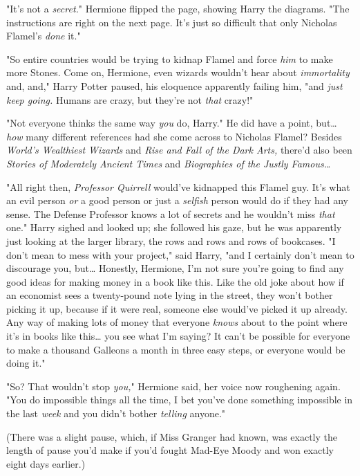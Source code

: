"It's not a \emph{secret.}" Hermione flipped the page, showing Harry the 
diagrams. "The instructions are right on the next page. It's just so difficult 
that only Nicholas Flamel's \emph{done} it."

"So entire countries would be trying to kidnap Flamel and force \emph{him} to 
make more Stones. Come on, Hermione, even wizards wouldn't hear about 
\emph{immortality} and, and," Harry Potter paused, his eloquence apparently 
failing him, "and \emph{just keep going.} Humans are crazy, but they're not 
\emph{that} crazy!"

"Not everyone thinks the same way \emph{you} do, Harry." He did have a point, 
but{\ldots} \emph{how} many different references had she come across to 
Nicholas Flamel? Besides \emph{World's Wealthiest Wizards} and \emph{Rise and 
Fall of the Dark Arts,} there'd also been \emph{Stories of Moderately Ancient 
Times} and \emph{Biographies of the Justly Famous{\ldots}}

"All right then, \emph{Professor Quirrell} would've kidnapped this Flamel guy. 
It's what an evil person \emph{or} a good person or just a \emph{selfish} 
person would do if they had any sense. The Defense Professor knows a lot of 
secrets and he wouldn't miss \emph{that} one." Harry sighed and looked up; she 
followed his gaze, but he was apparently just looking at the larger library, 
the rows and rows and rows of bookcases. "I don't mean to mess with your 
project," said Harry, "and I certainly don't mean to discourage you, 
but{\ldots} Honestly, Hermione, I'm not sure you're going to find any good 
ideas for making money in a book like this. Like the old joke about how if an 
economist sees a twenty-pound note lying in the street, they won't bother 
picking it up, because if it were real, someone else would've picked it up 
already. Any way of making lots of money that everyone \emph{knows} about to 
the point where it's in books like this{\ldots} you see what I'm saying? It 
can't be possible for everyone to make a thousand Galleons a month in three 
easy steps, or everyone would be doing it."

"So? That wouldn't stop \emph{you,}" Hermione said, her voice now roughening 
again. "You do impossible things all the time, I bet you've done something 
impossible in the last \emph{week} and you didn't bother \emph{telling} anyone."

(There was a slight pause, which, if Miss Granger had known, was exactly the 
length of pause you'd make if you'd fought Mad-Eye Moody and won exactly eight 
days earlier.)

